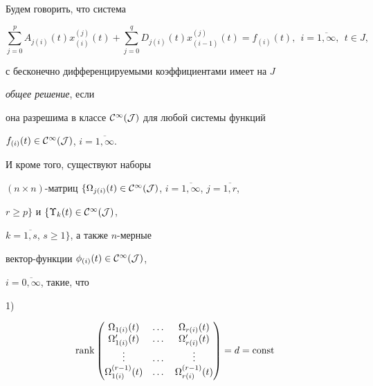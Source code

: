 \begin{defn}


Будем говорить, что система


\begin{equation}


\sum_{j=0}^{p}{A_{j(i)}(t)x_{(i)}^{(j)}(t)}+


\sum_{j=0}^{q}{D_{j(i)}(t)x_{(i-1)}^{(j)}(t)}=f_{(i)}(t), \ \


i=\overline{1,\infty},\ \ t \in J,


\end{equation}


с бесконечно дифференцируемыми коэффициентами имеет на $J$


{\it общее решение}, если


она разрешима в классе $\cal C^{\infty }(J)$ для любой системы функций


$f_{(i)}(t) \in \cal C^{\infty }(J)$, $i=\overline{1,\infty}$.


И кроме того, существуют наборы


$(n \times n)$-матриц $\lbrace \Omega_{j(i)}(t)


\in \cal C^{\infty }(J)$, $i=\overline{1, \infty }$, $j=\overline{1,r}$,


$r \ge p \rbrace$ и $\lbrace \Upsilon_k(t) \in \cal C^{\infty }(J)$,


$k=\overline{1,s}$, $s \ge 1 \rbrace$, а также $n$-мерные


вектор-функции $\phi_{(i)}(t) \in \cal C^{\infty }(J)$,


$i=\overline{0,\infty}$, такие, что 





1)


\begin{alignat}{2}


\rank


&\begin{pmatrix}


\Omega_{1(i)}(t) & \dotsc & \Omega_{r(i)}(t)\\


\Omega'_{1(i)}(t) & \dotsc & \Omega'_{r(i)}(t)\\ \vdots & \dotsc &


\vdots \\ \Omega_{1(i)}^{(r-1)}(t) & \dotsc &


\Omega_{r(i)}^{(r-1)}(t)


\end{pmatrix}=d=\const



\end{alignat}
\end{defn}
